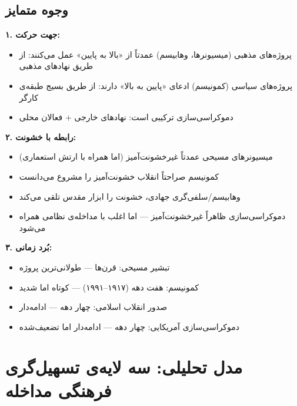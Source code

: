\subsection{وجوه متمایز}
\label{subsec:ch13-differences}

\begin{tcolorbox}[wavebox, title={تفاوت‌های کلیدی}]
\textbf{۱. جهت حرکت:}
\begin{itemize}
\item پروژه‌های مذهبی (میسیونرها، وهابیسم) عمدتاً از «بالا به پایین» عمل می‌کنند: از طریق نهادهای مذهبی
\item پروژه‌های سیاسی (کمونیسم) ادعای «پایین به بالا» دارند: از طریق بسیج طبقه‌ی کارگر
\item دموکراسی‌سازی ترکیبی است: نهادهای خارجی + فعالان محلی
\end{itemize}

\textbf{۲. رابطه با خشونت:}
\begin{itemize}
\item میسیونرهای مسیحی عمدتاً غیرخشونت‌آمیز (اما همراه با ارتش استعماری)
\item کمونیسم صراحتاً انقلاب خشونت‌آمیز را مشروع می‌دانست
\item وهابیسم/سلفی‌گری جهادی، خشونت را ابزار مقدس تلقی می‌کند
\item دموکراسی‌سازی ظاهراً غیرخشونت‌آمیز — اما اغلب با مداخله‌ی نظامی همراه می‌شود
\end{itemize}

\textbf{۳. بُرد زمانی:}
\begin{itemize}
\item تبشیر مسیحی: قرن‌ها — طولانی‌ترین پروژه
\item کمونیسم: هفت دهه (۱۹۱۷–۱۹۹۱) — کوتاه اما شدید
\item صدور انقلاب اسلامی: چهار دهه — ادامه‌دار
\item دموکراسی‌سازی آمریکایی: چهار دهه — ادامه‌دار اما تضعیف‌شده
\end{itemize}
\end{tcolorbox}


\section{مدل تحلیلی: سه لایه‌ی تسهیل‌گری فرهنگی مداخله}
\label{sec:ch13-model}



